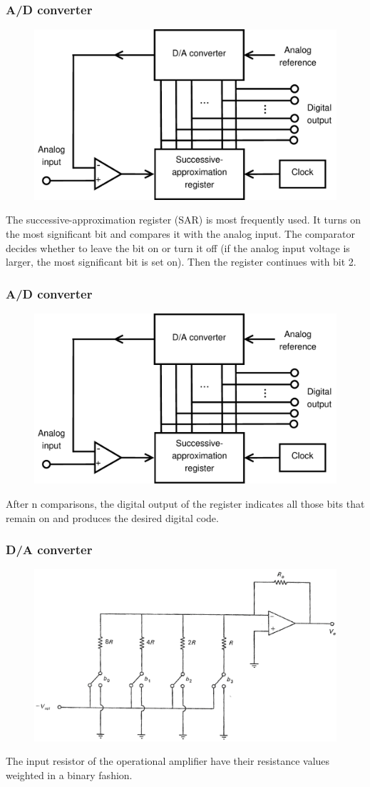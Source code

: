 \begin{frame}
	\frametitle{A/D converter}
	\begin{figure}
		\includegraphics[width=0.6\linewidth]{ADconverter}
	\end{figure}
	The successive-approximation register (SAR) is most frequently used. It turns on the most significant bit and compares it with the analog input. The comparator decides whether to leave the bit on or turn it off (if the analog input voltage is larger, the most significant bit is set on). Then the register continues with bit 2.
\end{frame}

\begin{frame}
	\frametitle{A/D converter}
	\begin{figure}
		\includegraphics[width=0.8\linewidth]{ADconverter}
	\end{figure}
	After n comparisons, the digital output of the register indicates all those bits that remain on and produces the desired digital code.
\end{frame}

\begin{frame}
	\frametitle{D/A converter}
	\vspace{-4ex}
	\begin{figure}
		\includegraphics[width=0.8\linewidth]{DAconverter}
	\end{figure}
	The input resistor of the operational amplifier have their resistance values weighted in a binary fashion. 
\end{frame}

